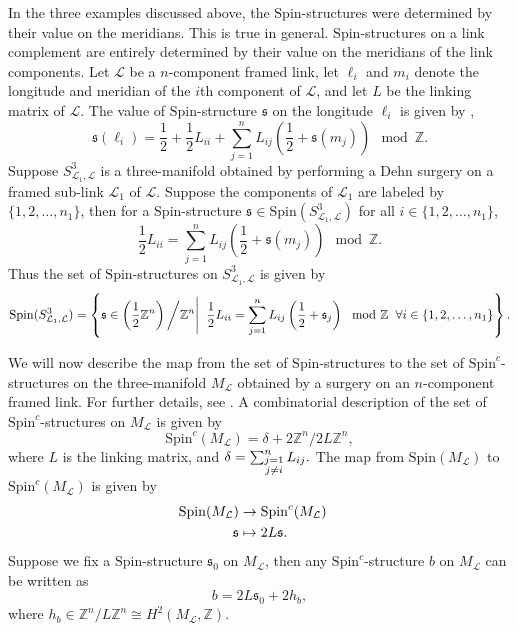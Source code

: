\documentclass{article}
\newcommand{\Z}{{\mathbb Z}}
\def\be{\begin{equation}}
\def\ee{\end{equation}}
\numberwithin{corollary}{theorem}
\numberwithin{corollary}{proposition}
\begin{document}
In the three examples discussed above, the $\mathrm{Spin}$-structures were determined by their value on the meridians. This is true in general. $\mathrm{Spin}$-structures on a link complement are entirely determined by their value on the meridians of the link components. Let $\mathcal{L}$ be a $n$-component framed link, let $\ell_{i}$ and $m_{i}$ denote the longitude and meridian of the $i$th component of $\mathcal{L}$, and let $L$ be the linking matrix of $\mathcal{L}$. The value of $\mathrm{Spin}$-structure $\mathfrak{s}$ on the longitude $\ell_{i}$ is given by \cite{Beliakova1996, BM1996}, 
\be 
\mathfrak{s}(\ell_{i}) = \frac{1}{2} + \frac{1}{2} L_{ii} + \sum_{j=1}^{n} L_{i j}\left(\frac{1}{2}+ \mathfrak{s}(m_{j})\right) \mod \Z.
\ee 
Suppose $S^{3}_{\mathcal{L}_{1},\mathcal{L}}$ is a three-manifold obtained by performing a Dehn surgery on a framed sub-link $\mathcal{L}_{1}$ of $\mathcal{L}$. Suppose the components of $\mathcal{L}_{1}$ are labeled by $\{1,2, \ldots , n_{1} \}$, then for a $\mathrm{Spin}$-structure $\mathfrak{s} \in \mathrm{Spin}(S^{3}_{\mathcal{L}_{1},\mathcal{L}})$ for all $i \in \{1,2, \ldots , n_{1} \}$,
\be 
\frac{1}{2} L_{ii} = \sum_{j=1}^{n} L_{i j}\left(\frac{1}{2}+ \mathfrak{s}(m_{j})\right) \mod \Z.
\ee 
Thus the set of $\mathrm{Spin}$-structures on $S^{3}_{\mathcal{L}_{1},\mathcal{L}}$ is given by 
\be 
\mathrm{Spin}(S^{3}_{\mathcal{L}_{1},\mathcal{L}})= \left\{ \mathfrak{s} \in \left( \frac{1}{2}\Z^{n} \right)\bigg/ \Z^{n} \Bigg\vert \hspace{0.2cm} \frac{1}{2} L_{ii} = \sum_{j=1}^{n} L_{i j}\left(\frac{1}{2}+ \mathfrak{s}_{j} \right) \mod \Z \hspace{0.2cm} \forall i \in \{1,2, \ldots , n_{1} \} \right\}.
\ee 

We will now describe the map from the set of $\mathrm{Spin}$-structures to the set of $\mathrm{Spin}^{c}$-structures on the three-manifold $M_{\mathcal{L}}$ obtained by a surgery on an $n$-component framed link. For further details, see \cite{DM2002}. A combinatorial description of the set of $\mathrm{Spin}^{c}$-structures on $M_{\mathcal{L}}$ is given by 
$$\mathrm{Spin}^{c}(M_{\mathcal{L}}) = \delta + 2 \Z^{n} / 2 L \Z^{n}, $$
where $L$ is the linking matrix, and 
$\delta = \sum_{\substack{j =1 \endline j \neq i}}^{n} L_{ij} .$
The map from $\mathrm{Spin}(M_{\mathcal{L}})$ to $\mathrm{Spin}^{c}(M_{\mathcal{L}})$ is given by 
\begin{align}
    \mathrm{Spin}(M_{\mathcal{L}}) & \rightarrow \mathrm{Spin}^{c}(M_{\mathcal{L}}) \endline
    \mathfrak{s} & \mapsto 2 L \mathfrak{s}.
\end{align}
Suppose we fix a $\mathrm{Spin}$-structure $\mathfrak{s}_{0}$ on $M_{\mathcal{L}}$, then any $\mathrm{Spin}^{c}$-structure $b$ on $M_{\mathcal{L}}$ can be written as $$b = 2 L \mathfrak{s}_{0} + 2 h_{b},$$ where $h_{b}\in \Z^{n}/ L \Z^{n} \cong H^{2}(M_{\mathcal{L}},\Z) $.
\end{document}
